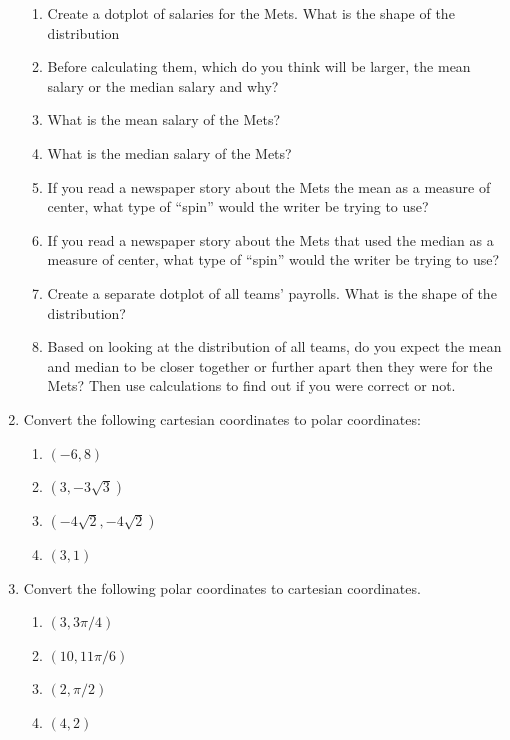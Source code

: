 \documentclass[12pt]{article}
\theoremstyle{plain}     %
\begin{document}
\begin{enumerate}
	\begin{enumerate}
		\item Create a dotplot of salaries for the Mets.  What is the shape of the distribution
		\item Before calculating them, which do you think will be larger, the mean salary or the median salary and why?
		\item What is the mean salary of the Mets?  
		\item What is the median salary of the Mets?   
		\item If you read a newspaper story about the Mets the mean as a measure of center, what type of “spin” would the writer be trying to use?
		\item If you read a newspaper story about the Mets that used the median as a measure of center, what type of “spin” would the writer be trying to use?
		\item Create a separate dotplot of all teams’ payrolls.  What is the shape of the distribution?  
		\item Based on looking at the distribution of all teams, do you expect the mean and median to be closer together or further apart then they were for the Mets?  Then use calculations to find out if you were correct or not.
\end{enumerate}	 
	\item \hspace{-2em}\llap{$*$}\hspace{2em}Convert the following cartesian coordinates to polar coordinates:
		\begin{enumerate}
			\item $(-6,8)$\\
			\item $(3,-3\sqrt{3})$\\
			\item $(-4\sqrt{2},-4\sqrt{2})$\\
			\item $(3,1)$\\
		\end{enumerate}
	
	\item \hspace{-2em}\llap{$*$}\hspace{2em}Convert the following polar coordinates to cartesian coordinates.
		\begin{enumerate}
			\item $(3,3\pi/4)$\\
			\item $(10,11\pi/6)$\\
			\item $(2,\pi/2)$\\
			\item $(4,2)$\\
		\end{enumerate}
	

\end{enumerate}
\end{document}
